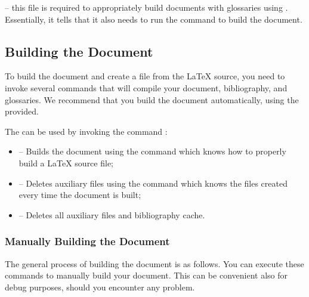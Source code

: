  -- this file is required to appropriately build documents with glossaries using . Essentially, it tells  that it also needs to run the command   to build the document.

\subsection{Building the Document}

To build the document and create a  file from the \LaTeX{} source, you need to invoke several commands that will compile your document, bibliography, and glossaries. We recommend that you build the document automatically, using the  provided.

The  can be used by invoking the command :
\begin{itemize}
\item {} -- Builds the document using the command  which knows how to properly build a \LaTeX{} source file;
\item {} -- Deletes auxiliary files using the command  which knows the files created every time the document is built;
\item {} -- Deletes all auxiliary files and bibliography cache.
\end{itemize}

\subsubsection*{Manually Building the Document}

The general process of building the document is as follows. You can execute these commands to manually build your document. This can be convenient also for debug purposes, should you encounter any problem.

